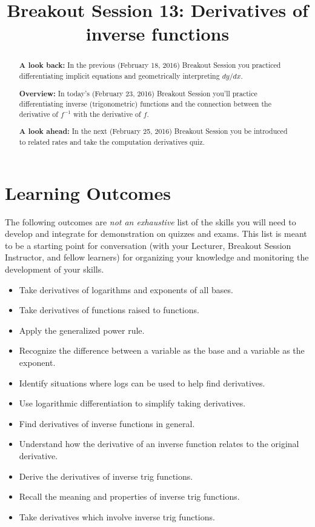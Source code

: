 \documentclass[handout,nooutcomes]{ximera}
\title{Breakout Session 13: Derivatives of inverse functions}
\begin{document}
\begin{abstract}
  \textbf{A look back:} In the previous (February 18, 2016) Breakout Session you practiced differentiating implicit equations and geometrically interpreting $dy/dx$.

  \textbf{Overview:} In today's (February 23, 2016) Breakout Session you'll practice differentiating inverse (trigonometric) functions and the connection between the derivative of $f^{-1}$ with the derivative of $f$.

  \textbf{A look ahead:} In the next (February 25, 2016) Breakout Session you be introduced to related rates and take the computation derivatives quiz.
\end{abstract}
\maketitle

\section{Learning Outcomes}
\label{section:learning-outcomes}
The following outcomes are \emph{not an exhaustive} list of the skills you will need to develop and integrate for demonstration on quizzes and exams.
This list is meant to be a starting point for conversation (with your Lecturer, Breakout Session Instructor, and fellow learners) for organizing your knowledge and monitoring the development of your skills.

\begin{itemize}
  \item
    Take derivatives of logarithms and exponents of all bases. 
  \item
    Take derivatives of functions raised to functions.
  \item
    Apply the generalized power rule. 
  \item 
    Recognize the difference between a variable as the base and a variable as the exponent.
  \item
    Identify situations where logs can be used to help find derivatives. 
  \item
    Use logarithmic differentiation to simplify taking derivatives. 
  \item
    Find derivatives of inverse functions in general. 
  \item
    Understand how the derivative of an inverse function relates to the original derivative. 
  \item
    Derive the derivatives of inverse trig functions.
  \item
    Recall the meaning and properties of inverse trig functions. 
  \item
    Take derivatives which involve inverse trig functions. 
\end{itemize}
\newpage
\end{document}
